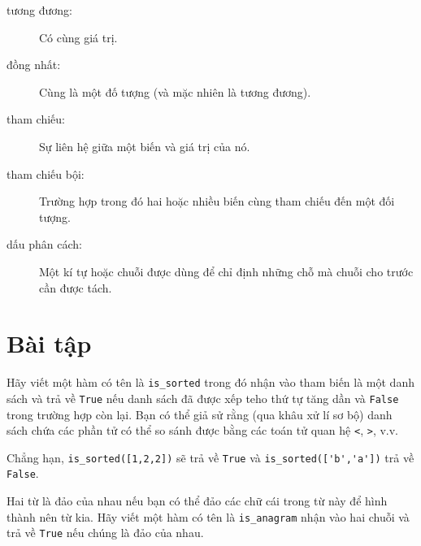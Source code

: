 \documentclass[11pt]{book}
\begin{document}
\begin{description}
\item[tương đương:] Có cùng giá trị.

\item[đồng nhất:] Cùng là một đố tượng (và mặc nhiên là tương đương).

\item[tham chiếu:] Sự liên hệ giữa một biến và giá trị của nó.

\item[tham chiếu bội:] Trường hợp trong đó hai hoặc nhiều biến cùng
tham chiếu đến một đối tượng.

\item[dấu phân cách:] Một kí tự hoặc chuỗi được dùng để chỉ định những chỗ
mà chuỗi cho trước cần được tách. 

\end{description}


\section{Bài tập}

\begin{ex}
Hãy viết một hàm có tên là \verb"is_sorted" trong đó nhận vào tham biến
là một danh sách và trả về {\tt True} nếu danh sách đã được xếp teho 
thứ tự tăng dần và {\tt False} trong trường hợp còn lại. Bạn có thể 
giả sử rằng (qua khâu xử lí sơ bộ) danh sách chứa các phần tử có thể so sánh được bằng các
toán tử quan hệ {\tt <}, {\tt >}, v.v.


Chẳng hạn, \verb"is_sorted([1,2,2])" sẽ trả về {\tt True}
và \verb"is_sorted(['b','a'])" trả về {\tt False}.
\end{ex}


\begin{ex}
\label{anagram}


Hai từ là đảo của nhau nếu bạn có thể đảo các chữ cái trong từ này
để hình thành nên từ kia. Hãy viết một hàm có tên là \verb"is_anagram"
nhận vào hai chuỗi và trả về {\tt True} nếu chúng là đảo của nhau.
\end{ex}
\end{document}
